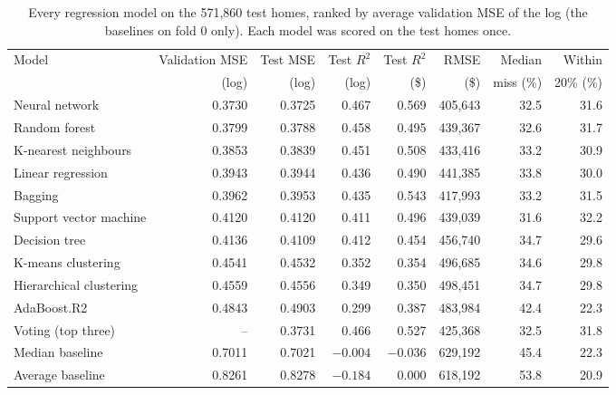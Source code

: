 \documentclass[sigconf,nonacm,10pt]{acmart}
\begin{document}
\begin{table}[t]
\caption{Every regression model on the 571,860 test homes, ranked by average validation MSE of the log (the baselines on fold 0 only). Each model was scored on the test homes once.}
\label{tab:test}
\small
\begin{tabular}{@{}lrrrrrrr@{}}
\toprule
Model & Validation MSE & Test MSE & Test $R^2$ & Test $R^2$ & RMSE & Median & Within \\
 & (log) & (log) & (log) & (\$) & (\$) & miss (\%) & 20\% (\%) \\
\midrule
Neural network & 0.3730 & 0.3725 & 0.467 & 0.569 & 405,643 & 32.5 & 31.6 \\
Random forest & 0.3799 & 0.3788 & 0.458 & 0.495 & 439,367 & 32.6 & 31.7 \\
K-nearest neighbours & 0.3853 & 0.3839 & 0.451 & 0.508 & 433,416 & 33.2 & 30.9 \\
Linear regression & 0.3943 & 0.3944 & 0.436 & 0.490 & 441,385 & 33.8 & 30.0 \\
Bagging & 0.3962 & 0.3953 & 0.435 & 0.543 & 417,993 & 33.2 & 31.5 \\
Support vector machine & 0.4120 & 0.4120 & 0.411 & 0.496 & 439,039 & 31.6 & 32.2 \\
Decision tree & 0.4136 & 0.4109 & 0.412 & 0.454 & 456,740 & 34.7 & 29.6 \\
K-means clustering & 0.4541 & 0.4532 & 0.352 & 0.354 & 496,685 & 34.6 & 29.8 \\
Hierarchical clustering & 0.4559 & 0.4556 & 0.349 & 0.350 & 498,451 & 34.7 & 29.8 \\
AdaBoost.R2 & 0.4843 & 0.4903 & 0.299 & 0.387 & 483,984 & 42.4 & 22.3 \\
Voting (top three) & -- & 0.3731 & 0.466 & 0.527 & 425,368 & 32.5 & 31.8 \\
Median baseline & 0.7011 & 0.7021 & $-0.004$ & $-0.036$ & 629,192 & 45.4 & 22.3 \\
Average baseline & 0.8261 & 0.8278 & $-0.184$ & 0.000 & 618,192 & 53.8 & 20.9 \\
\bottomrule
\end{tabular}
\end{table}
\end{document}
